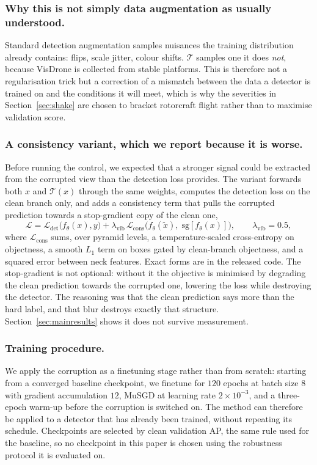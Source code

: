 \subsubsection{Why this is not simply data augmentation as usually understood.}
Standard detection augmentation samples nuisances the training distribution already
contains: flips, scale jitter, colour shifts. $\mathcal{T}$ samples one it does
\emph{not}, because VisDrone is collected from stable platforms. This is therefore
not a regularisation trick but a correction of a mismatch between the data a
detector is trained on and the conditions it will meet, which is why the severities
in Section~\ref{sec:shake} are chosen to bracket rotorcraft flight rather than to
maximise validation score.

\subsubsection{A consistency variant, which we report because it is worse.}
Before running the control, we expected that a stronger signal could be extracted
from the corrupted view than the detection loss provides. The variant forwards both
$x$ and $\mathcal{T}(x)$ through the same weights, computes the detection loss on
the clean branch only, and adds a consistency term that pulls the corrupted
prediction towards a stop-gradient copy of the clean one,
\begin{equation}
\mathcal{L} = \mathcal{L}_{\det}\bigl(f_\theta(x), y\bigr)
 + \lambda_{\mathrm{vib}} \, \mathcal{L}_{\mathrm{cons}}
 \bigl(f_\theta(\tilde{x}),\; \mathrm{sg}[f_\theta(x)]\bigr),
\qquad \lambda_{\mathrm{vib}} = 0.5,
\label{eq:vibcon}
\end{equation}
where $\mathcal{L}_{\mathrm{cons}}$ sums, over pyramid levels, a temperature-scaled
cross-entropy on objectness, a smooth $L_1$ term on boxes gated by clean-branch
objectness, and a squared error between neck features. Exact forms are in the
released code. The stop-gradient is not optional: without it the objective is
minimised by degrading the clean prediction towards the corrupted one, lowering the
loss while destroying the detector. The reasoning was that the clean prediction
says more than the hard label, and that blur destroys exactly that structure.
Section~\ref{sec:mainresults} shows it does not survive measurement.

\subsubsection{Training procedure.}
We apply the corruption as a finetuning stage rather than from scratch: starting
from a converged baseline checkpoint, we finetune for $120$ epochs at batch size
$8$ with gradient accumulation $12$, MuSGD at learning rate $2\times10^{-3}$, and a
three-epoch warm-up before the corruption is switched on. The method can therefore
be applied to a detector that has already been trained, without repeating its
schedule. Checkpoints are selected by clean validation AP, the same rule used for
the baseline, so no checkpoint in this paper is chosen using the robustness
protocol it is evaluated on.
